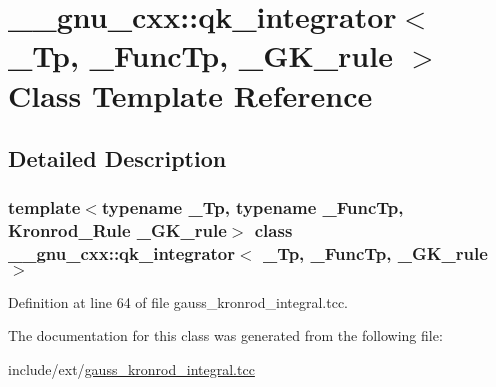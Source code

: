 \hypertarget{class____gnu__cxx_1_1qk__integrator}{}\section{\+\_\+\+\_\+gnu\+\_\+cxx\+:\+:qk\+\_\+integrator$<$ \+\_\+\+Tp, \+\_\+\+Func\+Tp, \+\_\+\+G\+K\+\_\+rule $>$ Class Template Reference}
\label{class____gnu__cxx_1_1qk__integrator}


\subsection{Detailed Description}
\subsubsection*{template$<$typename \+\_\+\+Tp, typename \+\_\+\+Func\+Tp, Kronrod\+\_\+\+Rule \+\_\+\+G\+K\+\_\+rule$>$\newline
class \+\_\+\+\_\+gnu\+\_\+cxx\+::qk\+\_\+integrator$<$ \+\_\+\+Tp, \+\_\+\+Func\+Tp, \+\_\+\+G\+K\+\_\+rule $>$}



Definition at line 64 of file gauss\+\_\+kronrod\+\_\+integral.\+tcc.



The documentation for this class was generated from the following file\+:\begin{DoxyCompactItemize}
\item 
include/ext/\hyperlink{gauss__kronrod__integral_8tcc}{gauss\+\_\+kronrod\+\_\+integral.\+tcc}\end{DoxyCompactItemize}
